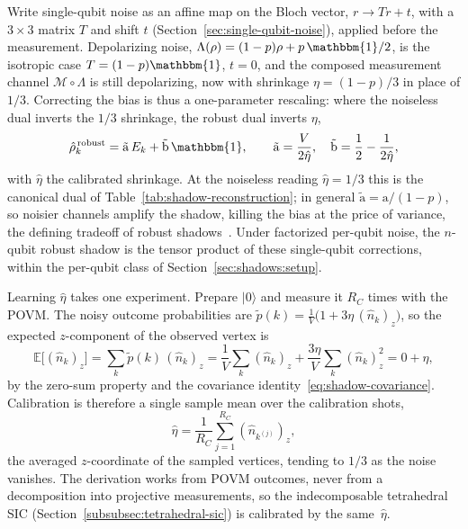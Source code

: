 \documentclass[11pt, oneside, openany]{scrbook}
\newcommand{\Id}{\mathbbm{1}}
\newcommand{\ket}[1]{|#1\rangle}
\begin{document}
Write single-qubit noise as an affine map on the Bloch vector, $r \to T r + t$, with a $3\times3$ matrix $T$ and shift $t$ (Section~\ref{sec:single-qubit-noise}), applied before the measurement. Depolarizing noise, $\Lambda(\rho) = (1-p)\rho + p\,\Id/2$, is the isotropic case $T = (1-p)\Id$, $t = 0$, and the composed measurement channel $\mathcal M \circ \Lambda$ is still depolarizing, now with shrinkage $\eta = (1-p)/3$ in place of $1/3$. Correcting the bias is thus a one-parameter rescaling: where the noiseless dual inverts the $1/3$ shrinkage, the robust dual inverts $\eta$,
\begin{equation*}
  \hat\rho_k^{\,\mathrm{robust}} = \tilde{\mathrm a}\, E_k + \tilde{\mathrm b}\,\Id, \qquad
  \tilde{\mathrm a} = \frac{V}{2\hat\eta}, \quad \tilde{\mathrm b} = \frac12 - \frac{1}{2\hat\eta},
\end{equation*}
with $\hat\eta$ the calibrated shrinkage. At the noiseless reading $\hat\eta = 1/3$ this is the canonical dual of Table~\ref{tab:shadow-reconstruction}; in general $\tilde{\mathrm a} = \mathrm a/(1-p)$, so noisier channels amplify the shadow, killing the bias at the price of variance, the defining tradeoff of robust shadows~\cite{chen2021robustshadowestimationa}. Under factorized per-qubit noise, the $n$-qubit robust shadow is the tensor product of these single-qubit corrections, within the per-qubit class of Section~\ref{sec:shadows:setup}.

Learning $\hat\eta$ takes one experiment. Prepare $\ket{0}$ and measure it $R_C$ times with the POVM. The noisy outcome probabilities are $\tilde p(k) = \frac1V\bigl(1 + 3\eta\,(\hat n_k)_z\bigr)$, so the expected $z$-component of the observed vertex is
\begin{equation*}
  \mathbb E\bigl[(\hat n_k)_z\bigr] = \sum_k \tilde p(k)\,(\hat n_k)_z
  = \frac1V\sum_k (\hat n_k)_z + \frac{3\eta}{V}\sum_k (\hat n_k)_z^2
  = 0 + \eta,
\end{equation*}
by the zero-sum property and the covariance identity~\eqref{eq:shadow-covariance}. Calibration is therefore a single sample mean over the calibration shots,
\begin{equation*}
  \hat\eta = \frac{1}{R_C}\sum_{j=1}^{R_C} (\hat n_{k^{(j)}})_z,
\end{equation*}
the averaged $z$-coordinate of the sampled vertices, tending to $1/3$ as the noise vanishes. The derivation works from POVM outcomes, never from a decomposition into projective measurements, so the indecomposable tetrahedral SIC (Section~\ref{subsubsec:tetrahedral-sic}) is calibrated by the same~$\hat\eta$.
\end{document}
